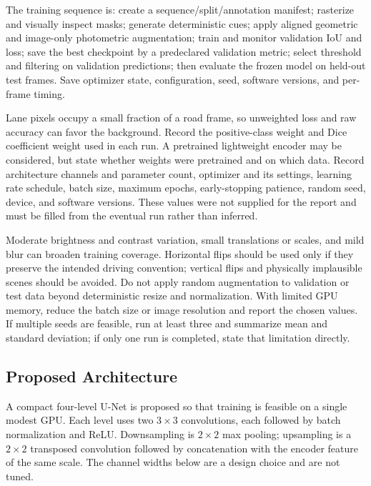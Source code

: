 \documentclass[10pt,a4paper,twocolumn]{article}
\begin{document}
The training sequence is: create a sequence/split/annotation manifest; rasterize and visually inspect masks; generate deterministic cues; apply aligned geometric and image-only photometric augmentation; train and monitor validation IoU and loss; save the best checkpoint by a predeclared validation metric; select threshold and filtering on validation predictions; then evaluate the frozen model on held-out test frames. Save optimizer state, configuration, seed, software versions, and per-frame timing.

Lane pixels occupy a small fraction of a road frame, so unweighted loss and raw accuracy can favor the background. Record the positive-class weight and Dice coefficient weight used in each run. A pretrained lightweight encoder may be considered, but state whether weights were pretrained and on which data. Record architecture channels and parameter count, optimizer and its settings, learning rate schedule, batch size, maximum epochs, early-stopping patience, random seed, device, and software versions. These values were not supplied for the report and must be filled from the eventual run rather than inferred.

Moderate brightness and contrast variation, small translations or scales, and mild blur can broaden training coverage. Horizontal flips should be used only if they preserve the intended driving convention; vertical flips and physically implausible scenes should be avoided. Do not apply random augmentation to validation or test data beyond deterministic resize and normalization. With limited GPU memory, reduce the batch size or image resolution and report the chosen values. If multiple seeds are feasible, run at least three and summarize mean and standard deviation; if only one run is completed, state that limitation directly.

\subsection{Proposed Architecture}
A compact four-level U-Net is proposed so that training is feasible on a single modest GPU. Each level uses two $3\times3$ convolutions, each followed by batch normalization and ReLU. Downsampling is $2\times2$ max pooling; upsampling is a $2\times2$ transposed convolution followed by concatenation with the encoder feature of the same scale. The channel widths below are a design choice and are not tuned.
\end{document}
